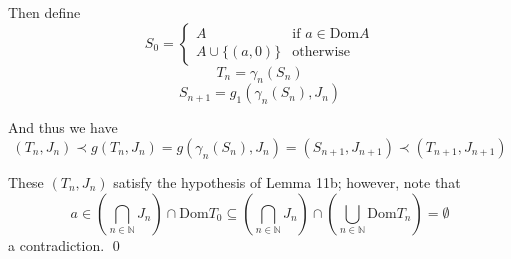 \documentclass[12pt]{article}
\theoremstyle{plain}
\theoremstyle{definition}
\theoremstyle{remark}
\begin{document}
Then define
\[
S_0 = \left\{
\begin{array}{ll}
A & \text{if } a \in \textrm{Dom} A \\
A \cup \{(a,0)\} & \text{otherwise}
\end{array}
\right.
\]
\[
T_n = \gamma_n(S_n)
\]
\[
S_{n+1} = g_1(\gamma_n(S_n),J_n)
\]

And thus we have
\[(T_n,J_n) \prec g(T_n,J_n) = g(\gamma_n(S_n),J_n) = (S_{n+1},J_{n+1}) \prec (T_{n+1},J_{n+1})\]

These $(T_n,J_n)$ satisfy the hypothesis of Lemma 11b; however, note that \[a \in \left(\bigcap_{n\in\mathbb{N}}J_n\right) \cap \textrm{Dom} T_0 \subseteq \left(\bigcap_{n\in\mathbb{N}}J_n\right) \cap \left(\bigcup_{n\in\mathbb{N}}\textrm{Dom} T_n\right) = \emptyset\] a contradiction. \qed
\end{document}
